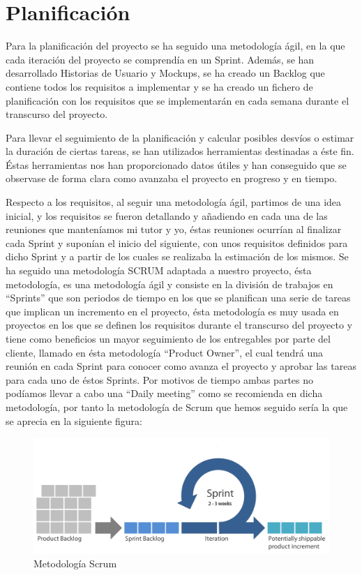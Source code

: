 \documentclass[11pt,openany]{book}
\begin{document}
\chapter{Planificación}

Para la planificación del proyecto se ha seguido una metodología ágil, en la que cada iteración del proyecto se comprendía en un Sprint. Además, se han desarrollado Historias de Usuario y Mockups, se ha creado un Backlog que contiene todos los requisitos a implementar y se ha creado un fichero de planificación con los requisitos que se implementarán en cada semana durante el transcurso del proyecto.

Para llevar el seguimiento de la planificación y calcular posibles desvíos o estimar la duración de ciertas tareas, se han utilizados herramientas destinadas a éste fin. Éstas herramientas nos han proporcionado datos útiles y han conseguido que se observase de forma clara como avanzaba el proyecto en progreso y en tiempo.

Respecto a los requisitos, al seguir una metodología ágil, partimos de una idea inicial, y los requisitos se fueron detallando y añadiendo en cada una de las reuniones que manteníamos mi tutor y yo, éstas reuniones ocurrían al finalizar cada Sprint y suponían el inicio del siguiente, con unos requisitos definidos para dicho Sprint y a partir de los cuales se realizaba la estimación de los mismos. Se ha seguido una metodología SCRUM\cite{13} adaptada a nuestro proyecto, ésta metodología, es una metodología ágil y consiste en la división de trabajos en ``Sprints'' que son periodos de tiempo en los que se planifican una serie de tareas que implican un incremento en el proyecto\cite{16}, ésta metodología es muy usada en proyectos en los que se definen los requisitos durante el transcurso del proyecto y tiene como beneficios un mayor seguimiento de los entregables por parte del cliente, llamado en ésta metodología ``Product Owner'', el cual tendrá una reunión en cada Sprint para conocer como avanza el proyecto y aprobar las tareas para cada uno de éstos Sprints. Por motivos de tiempo ambas partes no podíamos llevar a cabo una ``Daily meeting'' como se recomienda en dicha metodología, por tanto la metodología de Scrum que hemos seguido sería la que se aprecia en la siguiente figura:

\begin{figure}[H]
\includegraphics[totalheight=5cm]{scrum.png}
\caption{Metodología Scrum}
\end{figure}
\par\bigskip 
\noindent
\end{document}
